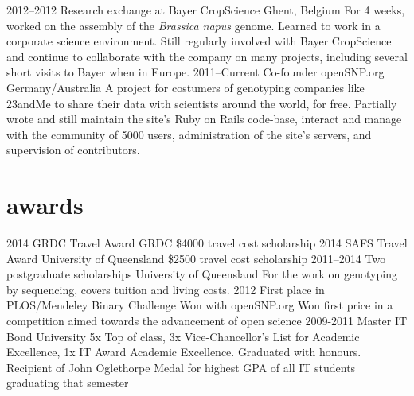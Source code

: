 \documentclass[]{friggeri-cv} %
\begin{document}
\begin{entrylist}
\entry
{2012--2012}
{Research exchange {\normalfont at Bayer CropScience}}
{Ghent, Belgium}
{For 4 weeks, worked on the assembly of the \textit{Brassica napus} genome. Learned to work in a corporate science environment. Still regularly involved with Bayer CropScience and continue to collaborate with the company on many projects, including several short visits to Bayer when in Europe.}
\entry
{2011--Current}
{Co-founder openSNP.org}
{Germany/Australia}
{A project for costumers of genotyping companies like 23andMe to share their data with scientists around the world, for free. Partially wrote and still maintain the site's Ruby on Rails code-base, interact and manage with the community of 5000 users, administration of the site's servers, and supervision of contributors.}


\end{entrylist}


\section{awards}

\begin{entrylist}
\entry
{2014}
{GRDC Travel Award}
{GRDC}
{\$4000 travel cost scholarship}
\entry
{2014}
{SAFS Travel Award}
{University of Queensland}
{\$2500 travel cost scholarship}
\entry
{2011--2014}
{Two postgraduate scholarships}
{University of Queensland}
{For the work on genotyping by sequencing, covers tuition and living costs.}
\entry
{2012}
{First place in PLOS/Mendeley Binary Challenge}
{Won with openSNP.org}
{Won first price in a competition aimed towards the advancement of open science}
\entry
{2009-2011}
{Master IT}
{Bond University}
{5x Top of class,  3x Vice-Chancellor's List for Academic Excellence, 1x IT Award Academic Excellence. Graduated with honours. Recipient of John Oglethorpe Medal for highest GPA of all IT students graduating that semester}
\end{entrylist}
\end{document}
